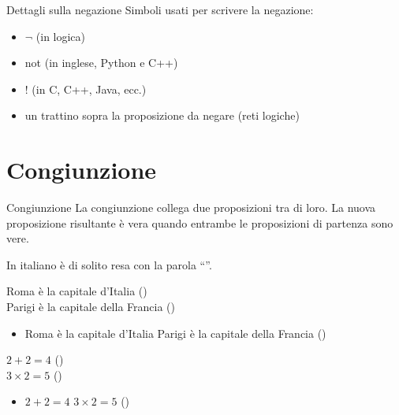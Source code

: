 \documentclass[aspectratio=169,10pt,dvipsnames,handout]{beamer}
\begin{document}
\begin{frame}{Dettagli sulla negazione}
    Simboli usati per scrivere la negazione:
    \begin{itemize}
        \item \alert{$\neg$ (in logica)}
        \item \alert{not (in inglese, Python e C++)}
        \item $\texttt{!}$ (in C, C++, Java, ecc.)
        \item un trattino sopra la proposizione da negare (reti logiche)
    \end{itemize}

\end{frame}

\section{Congiunzione}

\begin{frame}{Congiunzione}
    La \alert{congiunzione} collega due proposizioni tra di loro. La nuova proposizione risultante è vera quando entrambe le proposizioni di partenza sono vere. \medskip

    In italiano è di solito resa con la parola ``''.
    \begin{example}
        \propshape
        Roma è la capitale d'Italia (\checkmark) \\
        Parigi è la capitale della Francia (\checkmark)
        \pause
        \begin{itemize}
            \item Roma è la capitale d'Italia  Parigi è la capitale della Francia \pause (\checkmark)
        \end{itemize}

        \pause
        \medskip
        $2+2 = 4$ (\checkmark) \\
        $3 \times 2= 5$  (\xmark)
        \pause
        \begin{itemize}
            \item $2+2 = 4$  $3 \times  2= 5$ \pause (\xmark)
        \end{itemize}
    \end{example}
\end{frame}
\end{document}
